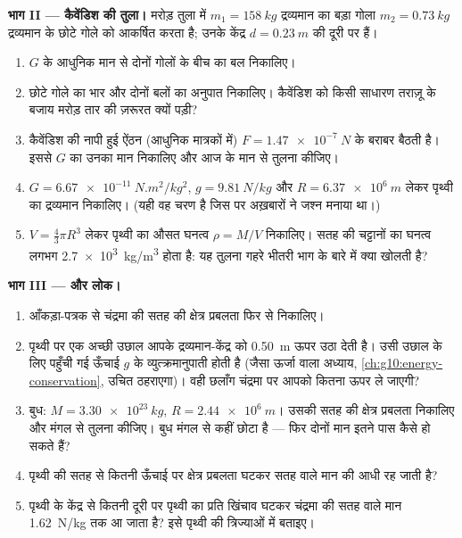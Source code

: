 \begin{problem}[{सप्ताहांत समस्या --- एक छप्पर में रखे सीसे के दो गोलों
से पृथ्वी के, और फिर सूर्य के द्रव्यमान तक: एक छोटा-सा नियतांक, एक बार
नाप लेने पर, किस काम आता है}]
\medskip
\noindent\textbf{भाग II --- कैवेंडिश की तुला।}
मरोड़ तुला में $m_1 = \qty{158}{kg}$ द्रव्यमान का बड़ा गोला $m_2 = \qty{0.73}{kg}$ द्रव्यमान के छोटे
गोले को आकर्षित करता है; उनके केंद्र $d = \qty{0.23}{m}$ की दूरी पर हैं।
\begin{enumerate}[resume]
  \item $G$ के आधुनिक मान से दोनों गोलों के बीच का बल निकालिए।
  \item छोटे गोले का भार और दोनों बलों का अनुपात निकालिए।
        कैवेंडिश को किसी साधारण तराज़ू के बजाय मरोड़ तार की ज़रूरत
        क्यों पड़ी?
  \item कैवेंडिश की नापी हुई ऐंठन (आधुनिक मात्रकों में)
        $F = \qty{1.47e-7}{N}$ के बराबर बैठती है। इससे $G$ का उनका मान निकालिए और
        आज के मान से तुलना कीजिए।
  \item $G = \qty{6.67e-11}{N.m^2/kg^2}$, $g = \qty{9.81}{N/kg}$ और $R = \qty{6.37e6}{m}$ लेकर पृथ्वी का द्रव्यमान निकालिए।
        (यही वह चरण है जिस पर अख़बारों ने जश्न मनाया था।)
  \item $V = \frac43 \pi R^3$ लेकर पृथ्वी का औसत घनत्व $\rho = M / V$ निकालिए। सतह की
        चट्टानों का घनत्व लगभग \qty{2.7e3}{kg/m^3} होता है: यह तुलना गहरे भीतरी भाग
        के बारे में क्या खोलती है?
\end{enumerate}

\medskip
\noindent\textbf{भाग III --- और लोक।}
\begin{enumerate}[resume]
  \item आँकड़ा-पत्रक से चंद्रमा की सतह की क्षेत्र प्रबलता फिर से
        निकालिए।
  \item पृथ्वी पर एक अच्छी उछाल आपके द्रव्यमान-केंद्र को \qty{0.50}{m} ऊपर
        उठा देती है। उसी उछाल के लिए पहुँची गई ऊँचाई $g$ के
        व्युत्क्रमानुपाती होती है (जैसा ऊर्जा वाला अध्याय, \cref{ch:g10:energy-conservation},
        उचित ठहराएगा)। वही छलाँग चंद्रमा पर आपको कितना ऊपर ले जाएगी?
  \item बुध: $M = \qty{3.30e23}{kg}$, $R = \qty{2.44e6}{m}$। उसकी सतह की क्षेत्र प्रबलता निकालिए और
        मंगल से तुलना कीजिए। बुध मंगल से कहीं छोटा है --- फिर दोनों मान
        इतने पास कैसे हो सकते हैं?
  \item पृथ्वी की सतह से कितनी ऊँचाई पर क्षेत्र प्रबलता घटकर सतह वाले
        मान की आधी रह जाती है?
  \item पृथ्वी के केंद्र से कितनी दूरी पर पृथ्वी का प्रति
         खिंचाव घटकर चंद्रमा की सतह वाले मान \qty{1.62}{N/kg}
        तक आ जाता है? इसे पृथ्वी की त्रिज्याओं में बताइए।
\end{enumerate}


\end{problem}
